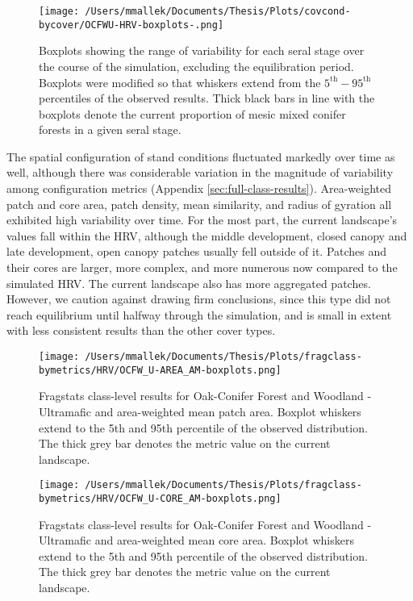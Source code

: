 \begin{figure}[!htbp]
  \centering
    \texttt{[image: /Users/mmallek/Documents/Thesis/Plots/covcond-bycover/OCFWU-HRV-boxplots-.png]}
  \caption{Boxplots showing the range of variability for each seral stage over the course of the simulation, excluding the equilibration period. Boxplots were modified so that whiskers extend from the $5^{\text{th}} - 95^{\text{th}}$ percentiles of the observed results. Thick black bars in line with the boxplots denote the current proportion of mesic mixed conifer forests in a given seral stage.} 
  \label{fig:covcond_ocfwu_boxplots}
\end{figure}

The spatial configuration of stand conditions fluctuated markedly over time as well, although there was considerable variation in the magnitude of variability among configuration metrics (Appendix \ref{sec:full-class-results}). Area-weighted patch and core area, patch density, mean similarity, and radius of gyration all exhibited high variability over time. For the most part, the current landscape's values fall within the HRV, although the middle development, closed canopy and late development, open canopy patches usually fell outside of it. Patches and their cores are larger, more complex, and more numerous now compared to the simulated HRV. The current landscape also has more aggregated patches. However, we caution against drawing firm conclusions, since this type did not reach equilibrium until halfway through the simulation, and is small in extent with less consistent results than the other cover types.

\begin{figure}[!htbp]
\centering
    \texttt{[image: /Users/mmallek/Documents/Thesis/Plots/fragclass-bymetrics/HRV/OCFW\_U-AREA\_AM-boxplots.png]}
  \caption{Fragstats class-level results for Oak-Conifer Forest and Woodland - Ultramafic and area-weighted mean patch area. Boxplot whiskers extend to the 5th and 95th percentile of the observed distribution. The thick grey bar denotes the metric value on the current landscape.}
  \label{fig:ocfwu_areaam}
\end{figure}


\begin{figure}[!htbp]
\centering
    \texttt{[image: /Users/mmallek/Documents/Thesis/Plots/fragclass-bymetrics/HRV/OCFW\_U-CORE\_AM-boxplots.png]}
  \caption{Fragstats class-level results for Oak-Conifer Forest and Woodland - Ultramafic and area-weighted mean core area. Boxplot whiskers extend to the 5th and 95th percentile of the observed distribution. The thick grey bar denotes the metric value on the current landscape.}
  \label{fig:ocfwu_coream}
\end{figure}


